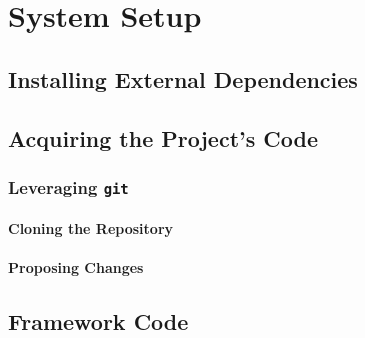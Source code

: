 \chapter{System Setup}
    \section{Installing External Dependencies}
    \section{Acquiring the Project's Code}
        \subsection{Leveraging \texttt{git}}
            \subsubsection{Cloning the Repository}
            \subsubsection{Proposing Changes}
    \section{Framework Code}